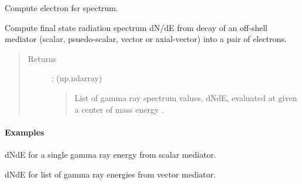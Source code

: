 \documentclass[letterpaper,10pt,english]{sphinxmanual}
\begin{document}
\begin{fulllineitems}
\label{\detokenize{modules:hazma.electron.fsr}}
Compute electron fsr spectrum.

Compute final state radiation spectrum dN/dE from decay of an off-shell
mediator (scalar, psuedo-scalar, vector or axial-vector) into a pair of
electrons.
\begin{quote}\begin{description}
\item[{Returns}] \leavevmode
{} : (np.ndarray)
\begin{quote}

List of gamma ray spectrum values, dNdE, evaluated at 
given a center of mass energy .
\end{quote}

\end{description}\end{quote}
\paragraph{Examples}

dNdE for a single gamma ray energy from scalar mediator.

\begin{sphinxVerbatim}[commandchars=\\\{\}]
   
    
    
\end{sphinxVerbatim}

dNdE for list of gamma ray energies from vector mediator.

\begin{sphinxVerbatim}[commandchars=\\\{\}]
   
     
  
    
\end{sphinxVerbatim}

\end{fulllineitems}
\end{document}
